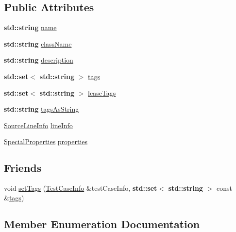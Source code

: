 \subsection*{Public Attributes}
\begin{DoxyCompactItemize}
\item 
\textbf{ std\+::string} \hyperlink{struct_catch_1_1_test_case_info_a463794e2f5cfead307c93efd134ade36}{name}
\item 
\textbf{ std\+::string} \hyperlink{struct_catch_1_1_test_case_info_a1a5e0825132a38d091defdebbf2f8ce9}{class\+Name}
\item 
\textbf{ std\+::string} \hyperlink{struct_catch_1_1_test_case_info_a37fe2db9425bc45f6a33893eac31198e}{description}
\item 
\textbf{ std\+::set}$<$ \textbf{ std\+::string} $>$ \hyperlink{struct_catch_1_1_test_case_info_a045f62e7719a8760a5b456f7fd2dc97c}{tags}
\item 
\textbf{ std\+::set}$<$ \textbf{ std\+::string} $>$ \hyperlink{struct_catch_1_1_test_case_info_a0ed3864a313e8ddc3ae38431be5be9ae}{lcase\+Tags}
\item 
\textbf{ std\+::string} \hyperlink{struct_catch_1_1_test_case_info_ac65c2d36fd36f71e9bf782b2ea245c64}{tags\+As\+String}
\item 
\hyperlink{struct_catch_1_1_source_line_info}{Source\+Line\+Info} \hyperlink{struct_catch_1_1_test_case_info_aa9407b7f442655b51a2aad24b3fa2fd3}{line\+Info}
\item 
\hyperlink{struct_catch_1_1_test_case_info_a39b232f74b4a7a6f2183b96759027eac}{Special\+Properties} \hyperlink{struct_catch_1_1_test_case_info_afc1e84bd7a2e180895a06d9131302af0}{properties}
\end{DoxyCompactItemize}
\subsection*{Friends}
\begin{DoxyCompactItemize}
\item 
void \hyperlink{struct_catch_1_1_test_case_info_addc10c770e56f49da5baa0c76cf25bd5}{set\+Tags} (\hyperlink{struct_catch_1_1_test_case_info}{Test\+Case\+Info} \&test\+Case\+Info, \textbf{ std\+::set}$<$ \textbf{ std\+::string} $>$ const \&\hyperlink{struct_catch_1_1_test_case_info_a045f62e7719a8760a5b456f7fd2dc97c}{tags})
\end{DoxyCompactItemize}


\subsection{Member Enumeration Documentation}
\mbox{\label{struct_catch_1_1_test_case_info_a39b232f74b4a7a6f2183b96759027eac}} 

